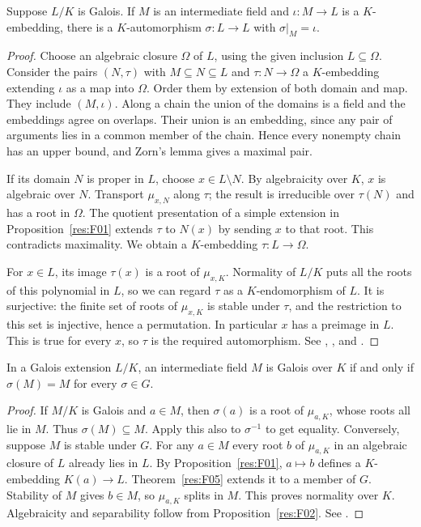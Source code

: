 \begin{theorem}
\label{res:F05}
Suppose \(L/K\) is Galois. If \(M\) is an intermediate field and
\(\iota:M\to L\) is a \(K\)-embedding, there is a \(K\)-automorphism
\(\sigma:L\to L\) with \(\sigma|_M=\iota\).
\end{theorem}
\begin{proof}
Choose an algebraic closure \(\Omega\) of \(L\), using the given
inclusion \(L\subseteq\Omega\). Consider the pairs \((N,\tau)\) with
\(M\subseteq N\subseteq L\) and \(\tau:N\to\Omega\) a \(K\)-embedding
extending \(\iota\) as a map into \(\Omega\). Order them by extension
of both domain and map. They include \((M,\iota)\). Along a chain
the union of the domains is a field and the embeddings agree on
overlaps. Their union is an embedding, since any pair of arguments
lies in a common member of the chain. Hence every nonempty chain
has an upper bound, and Zorn's lemma gives a maximal pair.

If its domain \(N\) is proper in \(L\), choose \(x\in L\setminus N\).
By algebraicity over \(K\), \(x\) is algebraic over \(N\).
Transport \(\mu_{x,N}\) along \(\tau\); the result is irreducible
over \(\tau(N)\) and has a root in \(\Omega\).
The quotient presentation of a simple extension in
Proposition~\ref{res:F01} extends \(\tau\) to \(N(x)\) by sending
\(x\) to that root. This contradicts maximality. We obtain a
\(K\)-embedding \(\tau:L\to\Omega\).

For \(x\in L\), its image \(\tau(x)\) is a root of \(\mu_{x,K}\).
Normality of \(L/K\) puts all the roots of this polynomial in \(L\),
so we can regard \(\tau\) as a \(K\)-endomorphism of \(L\).
It is surjective: the finite set of roots of \(\mu_{x,K}\) is
stable under \(\tau\), and the restriction to this set is injective,
hence a permutation. In particular \(x\) has a preimage in \(L\).
This is true for every \(x\), so \(\tau\) is the required
automorphism. See \cite[Theorem 6.6 and Proposition 7.4]{milne},
\cite[Chapter 12]{d07}, and \cite[Tag 0BME]{stacks}.
\end{proof}

\begin{corollary}\label{res:F06}
In a Galois extension \(L/K\), an intermediate field \(M\) is Galois
over \(K\) if and only if \(\sigma(M)=M\) for every \(\sigma\in G\).
\end{corollary}
\begin{proof}
If \(M/K\) is Galois and \(a\in M\), then \(\sigma(a)\) is a root of
\(\mu_{a,K}\), whose roots all lie in \(M\). Thus \(\sigma(M)\subseteq M\).
Apply this also to \(\sigma^{-1}\) to get equality.
Conversely, suppose \(M\) is stable under \(G\). For any \(a\in M\)
every root \(b\) of \(\mu_{a,K}\) in an algebraic closure of \(L\)
already lies in \(L\). By Proposition~\ref{res:F01}, \(a\mapsto b\)
defines a \(K\)-embedding \(K(a)\to L\).
Theorem~\ref{res:F05} extends it to a member of \(G\).
Stability of \(M\) gives \(b\in M\), so \(\mu_{a,K}\) splits in \(M\).
This proves normality over \(K\). Algebraicity and separability
follow from Proposition~\ref{res:F02}. See
\cite[Corollary 7.5 and Theorem 7.13(d)]{milne}.
\end{proof}

